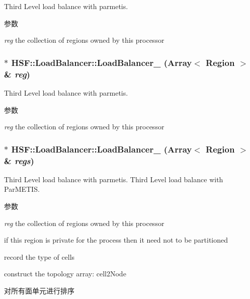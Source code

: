 Third Level load balance with parmetis. 
\begin{DoxyParams}{参数}
\item[{\em reg}]the collection of regions owned by this processor \end{DoxyParams}
\hypertarget{classHSF_1_1LoadBalancer_a9c6357abc32209101f62d07846cf8cff}{
\subsubsection[{LoadBalancer\_\-3}]{$\ast$ HSF::LoadBalancer::LoadBalancer\_ (Array$<$ {\bf Region} $>$ \& {\em reg})}}
\label{classHSF_1_1LoadBalancer_a9c6357abc32209101f62d07846cf8cff}


Third Level load balance with parmetis. 
\begin{DoxyParams}{参数}
\item[{\em reg}]the collection of regions owned by this processor \end{DoxyParams}
\hypertarget{classHSF_1_1LoadBalancer_a51cafaff8985b257cff113299e48697f}{
\subsubsection[{LoadBalancer\_\-3}]{ $\ast$ HSF::LoadBalancer::LoadBalancer\_ (Array$<$ {\bf Region} $>$ \& {\em regs})}}
\label{classHSF_1_1LoadBalancer_a51cafaff8985b257cff113299e48697f}


Third Level load balance with parmetis. Third Level load balance with ParMETIS.


\begin{DoxyParams}{参数}
\item[{\em reg}]the collection of regions owned by this processor \end{DoxyParams}


if this region is private for the process then it need not to be partitioned

record the type of cells

construct the topology array: cell2Node

对所有面单元进行排序


